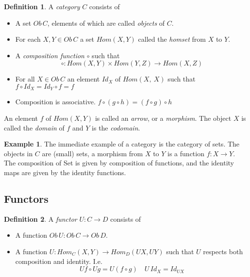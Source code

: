 \documentclass[a4paper,10pt]{article}
\theoremstyle{definition}
\newtheorem{definition}{Definition}[section]
\newtheorem{example}{Example}[section]
\begin{document}
\begin{definition}
    A \textit{category} $C$ consists of
    \begin{itemize}
        \item A set $Ob\,C$, elements of which are called \textit{objects} of $C$.
        \item For each $X, Y \in Ob\,C$
            a set $Hom(X,Y)$ called the \textit{homset} from $X$ to $Y$.
        \item A \textit{composition function} $\circ$ such that
            \begin{equation}
                \circ : Hom(X,Y) \times Hom(Y,Z) \rightarrow Hom(X,Z)
            \end{equation}
        \item For all $X \in Ob\,C$ an element $Id_X$ of $Hom(X,\ X)$
            such that $f \circ Id_X = Id_Y \circ f = f$
        \item Composition is associative.  $f \circ (g \circ h) = (f \circ g) \circ h$
    \end{itemize}
\end{definition}

\par
An element $f$ of $Hom(X,Y)$ is called an \textit{arrow},
or a \textit{morphism}. The object $X$ is called the \textit{domain} of $f$ and $Y$ is
the \textit{codomain}.\\

\begin{example}
    The immediate example of a category is the category of sets.
    The objects in $C$ are (small) sets,
    a morphism from $X$ to $Y$ is a function $f : X \rightarrow Y$.
    The composition of Set is given by composition of functions,
    and the identity maps are given by the identity functions.
\end{example}

\subsection{Functors}
\begin{definition}
    A \textit{functor} $U : C \rightarrow D$ consists of
    \begin{itemize}
        \item A function $Ob\,U : Ob\,C \rightarrow Ob\,D$.
        \item A function $U : Hom_C(X,Y) \rightarrow Hom_D(UX, UY)$
            such that $U$ respects both composition and identity.
            I.e.
            \begin{equation}
                Uf \circ Ug = U(f \circ g) \quad U\,Id_X = Id_{UX}
            \end{equation}
    \end{itemize}
\end{definition}
\end{document}
